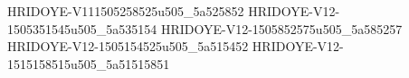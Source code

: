 HRIDOYE-V111505258525u505_5a525852
HRIDOYE-V12-1505351545u505_5a535154
HRIDOYE-V12-1505852575u505_5a585257 
HRIDOYE-V12-1505154525u505_5a515452
HRIDOYE-V12-1515158515u505_5a51515851
